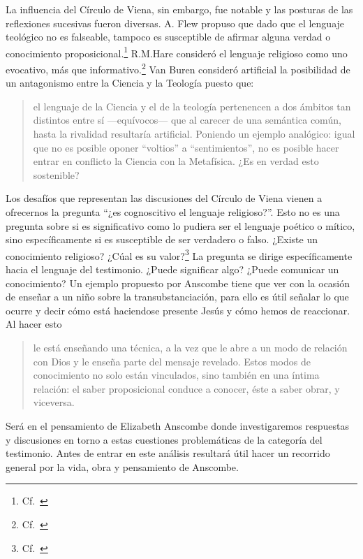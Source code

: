 La influencia del Círculo de Viena, sin embargo, fue notable y las posturas de
las reflexiones sucesivas fueron diversas. A. Flew propuso que dado que el
lenguaje teológico no es falseable, tampoco es susceptible de afirmar alguna
verdad o conocimiento proposicional.\footnote{Cf.~\cite[27--30]{conesa1994cc}}
R.M.Hare consideró el lenguaje religioso como uno evocativo, más que
informativo.\footnote{Cf.~\cite[35--36]{conesa1994cc}} Van Buren consideró
artificial la posibilidad de un antagonismo entre la Ciencia y la Teología
puesto que: \blockquote[{\cite[156]{dominguez2009at}}]{el lenguaje de la Ciencia
  y el de la teología pertenencen a dos ámbitos tan distintos entre sí
  ---equívocos--- que al carecer de una semántica común, hasta la rivalidad
  resultaría artificial. Poniendo un ejemplo analógico: igual que no es posible
  oponer ``voltios'' a ``sentimientos'', no es posible hacer entrar en conflicto
  la Ciencia con la Metafísica. ¿Es en verdad esto sostenible?}

Los desafíos que representan las discusiones del Círculo de Viena vienen a
ofrecernos la pregunta \enquote{¿es cognoscitivo el lenguaje religioso?}. Esto
no es una pregunta sobre si es significativo como lo pudiera ser el lenguaje
poético o mítico, sino específicamente si es susceptible de ser verdadero o
falso. ¿Existe un conocimiento religioso? ¿Cúal es su
valor?\footnote{Cf.~\cite[23]{conesa1994cc}} La pregunta se dirige
específicamente hacia el lenguaje del testimonio. ¿Puede significar algo? ¿Puede
comunicar un conocimiento? Un ejemplo propuesto por Anscombe tiene que ver con
la ocasión de enseñar a un niño sobre la transubstanciación, para ello es útil
señalar lo que ocurre y decir cómo está haciendose presente Jesús y cómo hemos
de reaccionar. Al hacer esto \blockquote[{\cite[21]{conesa1994cc}}]{le está
  enseñando una técnica, a la vez que le abre a un modo de relación con Dios y
  le enseña parte del mensaje revelado. Estos modos de conocimiento no solo
  están vinculados, sino también en una íntima relación: el saber proposicional
  conduce a conocer, éste a saber obrar, y viceversa.}

Será en el pensamiento de Elizabeth Anscombe donde investigaremos respuestas y
discusiones en torno a estas cuestiones problemáticas de la categoría del
testimonio. Antes de entrar en este análisis resultará útil hacer un recorrido
general por la vida, obra y pensamiento de Anscombe.
